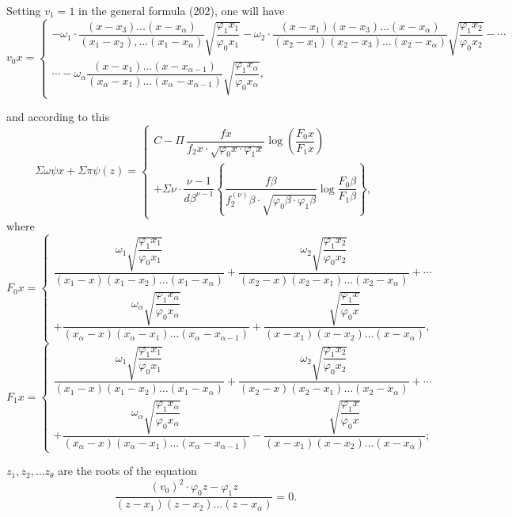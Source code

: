 \documentclass{article}
\begin{document}
Setting $v_1 = 1$ in the general formula (202), one will have
\[ v_0 x = \begin{cases}
-\omega_1 \cdot \dfrac{(x-x_3)\ldots(x-x_\alpha)}{(x_1-x_2),\ldots(x_1-x_\alpha)}\sqrt{\dfrac{\varphi_1 x_1}{\varphi_0 x_1}} - \omega_2 \cdot \dfrac{(x-x_1)(x-x_3)\ldots(x-x_\alpha)}{(x_2-x_1)(x_2-x_3)\ldots(x_2-x_\alpha)}\sqrt{\dfrac{\varphi_1 x_2}{\varphi_0 x_2}} - \cdots \\
\cdots - \omega_\alpha \dfrac{(x-x_1)\ldots(x-x_{\alpha-1})}{(x_\alpha-x_1)\ldots(x_\alpha-x_{\alpha-1})}\sqrt{\dfrac{\varphi_1 x_\alpha}{\varphi_0 x_\alpha}},
\end{cases} \]

and according to this
\[ \Sigma\omega\psi x + \Sigma\pi\psi(z) = \begin{cases}
C - \Pi\,\dfrac{f x}{f_2 x \cdot \sqrt{\varphi_0 x \cdot \varphi_1 x}}\log\left(\dfrac{F_0 x}{F_1 x}\right) \\
+ \Sigma\nu \cdot \dfrac{\nu-1}{d\beta^{\nu-1}} \left\{ \dfrac{f\beta}{f_2^{(\nu)}\beta \cdot \sqrt{\varphi_0\beta \cdot \varphi_1\beta}}\log\dfrac{F_0\beta}{F_1\beta} \right\},
\end{cases} \]
where
\[ F_0 x = \begin{cases}
\dfrac{\omega_1\sqrt{\dfrac{\varphi_1 x_1}{\varphi_0 x_1}}}{(x_1-x)(x_1-x_2)\ldots(x_1-x_\alpha)} + \dfrac{\omega_2\sqrt{\dfrac{\varphi_1 x_2}{\varphi_0 x_2}}}{(x_2-x)(x_2-x_1)\ldots(x_2-x_\alpha)} + \cdots \\
+ \dfrac{\omega_\alpha\sqrt{\dfrac{\varphi_1 x_\alpha}{\varphi_0 x_\alpha}}}{(x_\alpha-x)(x_\alpha-x_1)\ldots(x_\alpha-x_{\alpha-1})} + \dfrac{\sqrt{\dfrac{\varphi_1 x}{\varphi_0 x}}}{(x-x_1)(x-x_2)\ldots(x-x_\alpha)},
\end{cases} \]
\[ F_1 x = \begin{cases}
\dfrac{\omega_1\sqrt{\dfrac{\varphi_1 x_1}{\varphi_0 x_1}}}{(x_1-x)(x_1-x_2)\ldots(x_1-x_\alpha)} + \dfrac{\omega_2\sqrt{\dfrac{\varphi_1 x_2}{\varphi_0 x_2}}}{(x_2-x)(x_2-x_1)\ldots(x_2-x_\alpha)} + \cdots \\
+ \dfrac{\omega_\alpha\sqrt{\dfrac{\varphi_1 x_\alpha}{\varphi_0 x_\alpha}}}{(x_\alpha-x)(x_\alpha-x_1)\ldots(x_\alpha-x_{\alpha-1})} - \dfrac{\sqrt{\dfrac{\varphi_1 x}{\varphi_0 x}}}{(x-x_1)(x-x_2)\ldots(x-x_\alpha)};
\end{cases} \]

$z_1, z_2, \ldots z_\theta$ are the roots of the equation
\[ \frac{(v_0)^{2} \cdot \varphi_0 z-\varphi_1 z}{(z-x_1)(z-x_2)\ldots(z-x_\alpha)} = 0. \]
\end{document}
